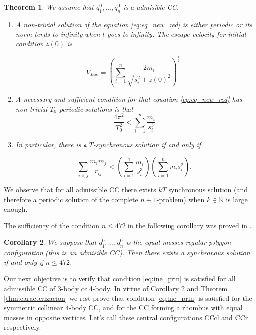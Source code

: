 \documentclass[twoside]{article}
\newtheorem{thm}{Theorem}[section]
\newtheorem{cor}[thm]{Corollary}
\theoremstyle{remark}
\begin{document}
\begin{thm}\label{thm:prin_ine} We assume that $q_1^0,\ldots,q_n^0$ is a admisible CC.
\begin{enumerate}
 \item\label{1} A non-trivial solution of the equation \eqref{eq:eq_new_red} is either periodic or  its norm tends to infinity when $t$ goes to infinity. The escape velocity for initial condition $z(0)$ is

 \begin{equation}\label{eq:vel.esc}
 V_{Esc}=\left(\sum_{i=1}^{n}\frac{2m_i}{\sqrt{s_i^2+z(0)^2}}\right)^{\frac12}.
 \end{equation}

 \item\label{2} A necessary and sufficient condition for that equation \eqref{eq:eq_new_red} has non trivial $T_0$-periodic solutions is that
\begin{equation}\label{eq:ine_T0-per-cond}
 \frac{4\pi^2}{T_0^2}<\sum_{i=1}^n\frac{m_i}{s_i^3}
\end{equation}
\item\label{3} In particular, there is a $T$-synchronous solution if and only if

\begin{equation}\label{eq:ine_prin}
 \sum_{i<j}\frac{m_im_j}{r_{ij}}<\left(\sum_{i=1}^n\frac{m_i}{s_i^3}\right)\left(\sum_{i=1}^nm_is_i^2\right).
\end{equation}
\end{enumerate}

\end{thm}

We observe that for all admissible CC there exists $kT$ synchronous solution (and therefore a periodic solution of the complete $n+1$-problem) when $k\in \mathbb{N}$ is  large enough.

The sufficiency of the condition $n\leq 472$ in the following corollary  was proved in \cite{li2013characterization}.

\begin{cor}\label{cor:nleq472}
We suppose that $q_1^0,\ldots,q_n^0$ is the equal masses regular polygon configuration  (this is an admisible CC). Then there exists a synchronous solution if and only if $n\leq 472$.
\end{cor}




Our next objective is to verify that condition \eqref{eq:ine_prin} is satisfied for all admissible CC of 3-body or 4-body. In virtue of Corollary \ref{cor:nleq472} and Theorem \ref{thm:caracterizacion}  we rest prove that condition \eqref{eq:ine_prin} is satisfied for the symmetric collinear $4$-body CC, and for the CC forming a rhombus with equal masses in opposite vertices. Let's call these central configurations CCcl and CCr respectively.
\end{document}

